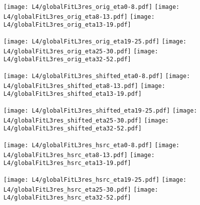 \documentclass[landscape,10pt]{beamer} %
\begin{document}
{\newpage

\begin{figure}[p]
\centering
  \texttt{[image: L4/globalFitL3res\_orig\_eta0-8.pdf]}
  \texttt{[image: L4/globalFitL3res\_orig\_eta8-13.pdf]}
  \texttt{[image: L4/globalFitL3res\_orig\_eta13-19.pdf]}
\end{figure}
\begin{figure}[p]
\centering
  \texttt{[image: L4/globalFitL3res\_orig\_eta19-25.pdf]}
  \texttt{[image: L4/globalFitL3res\_orig\_eta25-30.pdf]}
  \texttt{[image: L4/globalFitL3res\_orig\_eta32-52.pdf]}
\end{figure}

\newpage

\begin{figure}[p]
\centering
  \texttt{[image: L4/globalFitL3res\_shifted\_eta0-8.pdf]}
  \texttt{[image: L4/globalFitL3res\_shifted\_eta8-13.pdf]}
  \texttt{[image: L4/globalFitL3res\_shifted\_eta13-19.pdf]}
\end{figure}
\begin{figure}[p]
\centering
  \texttt{[image: L4/globalFitL3res\_shifted\_eta19-25.pdf]}
  \texttt{[image: L4/globalFitL3res\_shifted\_eta25-30.pdf]}
  \texttt{[image: L4/globalFitL3res\_shifted\_eta32-52.pdf]}
\end{figure}

\newpage

\begin{figure}[p]
\centering
  \texttt{[image: L4/globalFitL3res\_hsrc\_eta0-8.pdf]}
  \texttt{[image: L4/globalFitL3res\_hsrc\_eta8-13.pdf]}
  \texttt{[image: L4/globalFitL3res\_hsrc\_eta13-19.pdf]}
\end{figure}
\begin{figure}[p]
\centering
  \texttt{[image: L4/globalFitL3res\_hsrc\_eta19-25.pdf]}
  \texttt{[image: L4/globalFitL3res\_hsrc\_eta25-30.pdf]}
  \texttt{[image: L4/globalFitL3res\_hsrc\_eta32-52.pdf]}
\end{figure}

}
\end{document}
